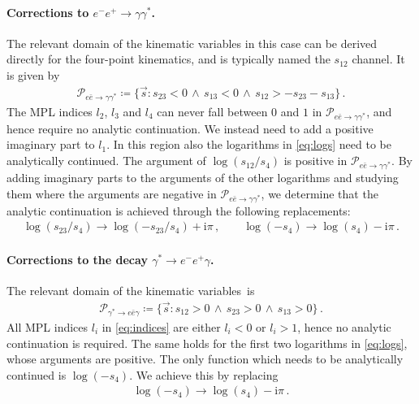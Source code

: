 \smallskip

\paragraph{Corrections to $e^- e^+ \to \gamma \gamma^*$.} The relevant domain of the kinematic variables in this case can be derived directly for the four-point kinematics, and is typically named the $s_{12}$ channel. It is given by 
\begin{align}
\label{eq:region_eebar}
\mathcal{P}_{e\bar{e}\to\gamma\gamma^*} \coloneqq \{\vec{s} \colon s_{23} < 0 \, \land \, s_{13} < 0 \, \land \, s_{12} > - s_{23} - s_{13} \} \,.
\end{align}
The \ac{MPL} indices $l_2$, $l_3$ and $l_4$ can never fall between $0$ and $1$ in $\mathcal{P}_{e\bar{e}\to\gamma\gamma^*}$, and hence require no analytic continuation. We instead need to add a positive imaginary part to $l_1$. 
In this region also the logarithms in \cref{eq:logs} need to be analytically continued. The argument of $\log(s_{12}/s_4)$ is positive in $\mathcal{P}_{e\bar{e}\to\gamma\gamma^*}$. By adding imaginary parts to the arguments of the other logarithms and studying them where the arguments are negative in $\mathcal{P}_{e\bar{e}\to\gamma\gamma^*}$, we determine that the analytic continuation is achieved through the following replacements:
\begin{align}
\log(s_{23}/s_4) \longrightarrow \log(-s_{23}/s_{4})+ \mathrm{i} \pi \,, \qquad  \log(-s_4) \longrightarrow \log(s_4)- \mathrm{i} \pi \,.
\end{align}


\paragraph{Corrections to the decay $\gamma^* \to e^- e^+ \gamma$.} The relevant domain of the kinematic variables~is
\begin{align}
\label{eq:region_decay}
\mathcal{P}_{\gamma^*\to e \bar{e} \gamma} \coloneqq  \{ \vec{s} \colon s_{12} > 0 \, \land \, s_{23} > 0 \, \land \,  s_{13} > 0 \} \,.
\end{align}
All \ac{MPL} indices $l_i$ in \cref{eq:indices} are either $l_i < 0$ or $l_i > 1$, hence no analytic continuation is required. The same holds for the first two logarithms in \cref{eq:logs}, whose arguments are positive. The only function which needs to be analytically continued is $\log(-s_4)$. We achieve this by replacing
\begin{align}
\log(-s_4) \longrightarrow \log(s_{4}) - \mathrm{i} \pi \,.
\end{align}

